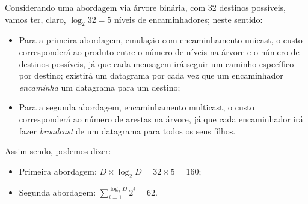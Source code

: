 
\begin{enumerate}[leftmargin=\labelsep]

        Considerando uma abordagem via árvore binária, com 32 destinos possíveis,
        vamos ter, claro, $\log_2{32} = 5$ níveis de encaminhadores; neste sentido:

        \begin{itemize}
          \item Para a primeira abordagem, emulação com encaminhamento unicast,
                o custo corresponderá ao produto entre o número de níveis na árvore e
                o número de destinos possíveis, já que cada mensagem irá seguir um caminho
                específico por destino; existirá um datagrama por cada
                vez que um encaminhador \textit{encaminha} um datagrama para um destino;
          \item Para a segunda abordagem, encaminhamento multicast, o custo corresponderá
                ao número de arestas na árvore, já que cada encaminhador irá fazer
                \textit{broadcast} de um datagrama para todos os seus filhos.
        \end{itemize}

        Assim sendo, podemos dizer:

        \begin{itemize}
          \item Primeira abordagem: $D \times \log_2{D} = 32 \times 5 = 160$;
          \item Segunda abordagem: $\sum_{i=1}^{\log_2{D}} 2^i = 62$.
        \end{itemize}



\end{enumerate}
